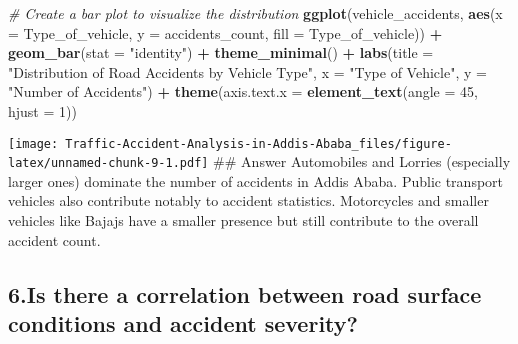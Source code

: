 \documentclass[
]{article}
\newenvironment{Shaded}{\begin{snugshade}}{\end{snugshade}}
\newcommand{\AttributeTok}[1]{\textcolor[rgb]{0.13,0.29,0.53}{#1}}
\newcommand{\CommentTok}[1]{\textcolor[rgb]{0.56,0.35,0.01}{\textit{#1}}}
\newcommand{\DecValTok}[1]{\textcolor[rgb]{0.00,0.00,0.81}{#1}}
\newcommand{\FunctionTok}[1]{\textcolor[rgb]{0.13,0.29,0.53}{\textbf{#1}}}
\newcommand{\NormalTok}[1]{#1}
\newcommand{\OtherTok}[1]{\textcolor[rgb]{0.56,0.35,0.01}{#1}}
\newcommand{\SpecialCharTok}[1]{\textcolor[rgb]{0.81,0.36,0.00}{\textbf{#1}}}
\newcommand{\StringTok}[1]{\textcolor[rgb]{0.31,0.60,0.02}{#1}}
\begin{document}
\begin{Shaded}
\begin{Highlighting}[]
\CommentTok{\# Create a bar plot to visualize the distribution}
\FunctionTok{ggplot}\NormalTok{(vehicle\_accidents, }\FunctionTok{aes}\NormalTok{(}\AttributeTok{x =}\NormalTok{ Type\_of\_vehicle, }\AttributeTok{y =}\NormalTok{ accidents\_count, }\AttributeTok{fill =}\NormalTok{ Type\_of\_vehicle)) }\SpecialCharTok{+}
  \FunctionTok{geom\_bar}\NormalTok{(}\AttributeTok{stat =} \StringTok{"identity"}\NormalTok{) }\SpecialCharTok{+}
  \FunctionTok{theme\_minimal}\NormalTok{() }\SpecialCharTok{+}
  \FunctionTok{labs}\NormalTok{(}\AttributeTok{title =} \StringTok{"Distribution of Road Accidents by Vehicle Type"}\NormalTok{,}
       \AttributeTok{x =} \StringTok{"Type of Vehicle"}\NormalTok{, }\AttributeTok{y =} \StringTok{"Number of Accidents"}\NormalTok{) }\SpecialCharTok{+}
  \FunctionTok{theme}\NormalTok{(}\AttributeTok{axis.text.x =} \FunctionTok{element\_text}\NormalTok{(}\AttributeTok{angle =} \DecValTok{45}\NormalTok{, }\AttributeTok{hjust =} \DecValTok{1}\NormalTok{))}
\end{Highlighting}
\end{Shaded}

\texttt{[image: Traffic-Accident-Analysis-in-Addis-Ababa\_files/figure-latex/unnamed-chunk-9-1.pdf]}
\#\# Answer Automobiles and Lorries (especially larger ones) dominate
the number of accidents in Addis Ababa. Public transport vehicles also
contribute notably to accident statistics. Motorcycles and smaller
vehicles like Bajajs have a smaller presence but still contribute to the
overall accident count.

\hypertarget{is-there-a-correlation-between-road-surface-conditions-and-accident-severity}{%
\subsection{6.Is there a correlation between road surface conditions and
accident
severity?}\label{is-there-a-correlation-between-road-surface-conditions-and-accident-severity}}

\begin{Shaded}
\end{Shaded}
\end{document}
